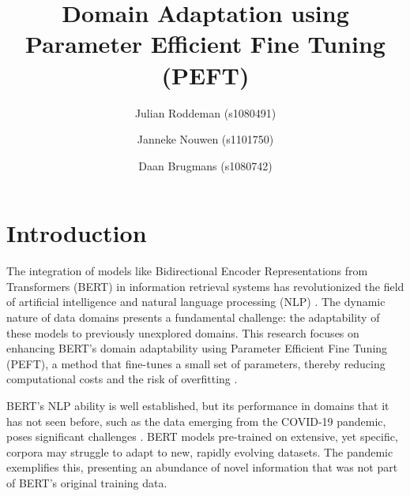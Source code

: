 \documentclass[sigconf, natbib=true]{acmart}
\begin{document}
\title{Domain Adaptation using Parameter Efficient Fine Tuning (PEFT)}

\author{Julian Roddeman (s1080491)}

\author{Janneke Nouwen (s1101750)}

\author{Daan Brugmans (s1080742)}




\maketitle

\section{Introduction}
\label{sec:intro}
The integration of models like Bidirectional Encoder Representations from Transformers (BERT) in information retrieval systems has revolutionized the field of artificial intelligence and natural language processing (NLP) \cite{devlin2018bert}. The dynamic nature of data domains presents a fundamental challenge: the adaptability of these models to previously unexplored domains. This research focuses on enhancing BERT's domain adaptability using Parameter Efficient Fine Tuning (PEFT), a method that fine-tunes a small set of parameters, thereby reducing computational costs and the risk of overfitting \cite{Soekhoe2016}.

BERT's NLP ability is well established, but its performance in domains that it has not seen before, such as the data emerging from the COVID-19 pandemic, poses significant challenges \cite{thakur2021beir}. BERT models pre-trained on extensive, yet specific, corpora may struggle to adapt to new, rapidly evolving datasets. The pandemic exemplifies this, presenting an abundance of novel information that was not part of BERT's original training data.
\end{document}
